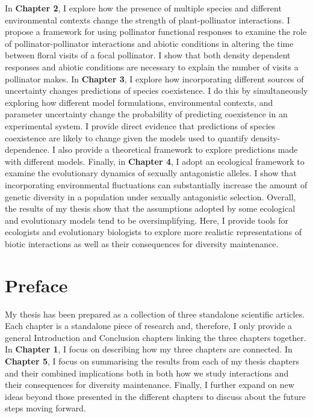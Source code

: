 \documentclass[12pt]{article}
\begin{document}
In \textbf{Chapter 2}, I explore how the presence of multiple species and different environmental contexts change the strength of plant-pollinator interactions. I propose a framework for using pollinator functional responses to examine the role of pollinator-pollinator interactions and abiotic conditions in altering the time between floral visits of a focal pollinator. I show that both density dependent responses and abiotic conditions are necessary to explain the number of visits a pollinator makes. In \textbf{Chapter 3},  I explore how incorporating different sources of uncertainty changes predictions of species coexistence. I do this by simultaneously exploring how different model formulations, environmental contexts, and parameter uncertainty change the probability of predicting coexistence in an experimental system. I provide direct evidence that predictions of species coexistence are likely to change given the models used to quantify density-dependence. I also provide a theoretical framework to explore predictions made with different models. Finally, in \textbf{Chapter 4}, I adopt an ecological framework to examine the evolutionary dynamics of sexually antagonistic alleles. I show that incorporating environmental fluctuations can substantially increase the amount of genetic diversity in a population under sexually antagonistic selection. Overall, the results of my thesis show that the assumptions adopted by some ecological and evolutionary models tend to be oversimplifying. Here, I provide tools for ecologists and evolutionary biologists to explore  more realistic representations of biotic interactions as well as their consequences for diversity maintenance.

\clearpage
\section*{Preface}

My thesis has been prepared as a collection of three standalone scientific articles. Each chapter is a standalone piece of research and, therefore, I only provide a general Introduction and Conclusion chapters linking the three chapters together. In  \textbf{Chapter 1}, I focus on describing how my three chapters are connected. In \textbf{Chapter 5}, I focus on summarising the results from each of my thesis chapters and their combined implications both in both how we study interactions and their consequences for diversity maintenance. Finally, I further expand on new ideas beyond those presented in the different chapters to discuss about the future steps moving forward.
\end{document}

